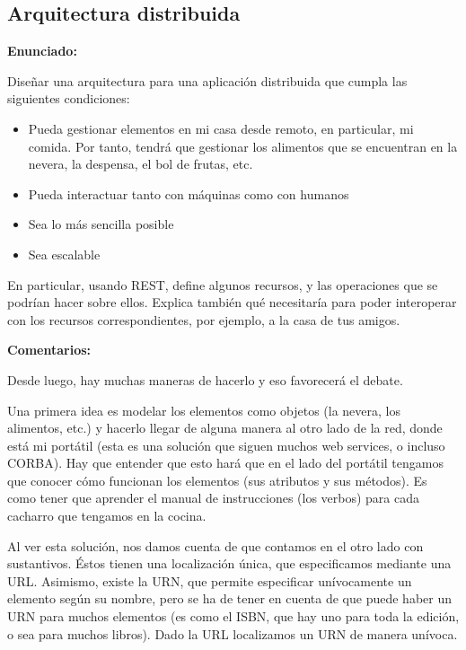 \subsection{Arquitectura distribuida}
\label{subsec:arq-distribuida}

\textbf{Enunciado:}

Diseñar una arquitectura para una aplicación distribuida que cumpla las siguientes condiciones:

\begin{itemize}
\item Pueda gestionar elementos en mi casa desde remoto, en particular, mi comida. Por tanto, tendrá que gestionar los alimentos que se encuentran en la nevera, la despensa, el bol de frutas, etc.
\item Pueda interactuar tanto con máquinas como con humanos
\item Sea lo más sencilla posible
\item Sea escalable
\end{itemize}

En particular, usando REST, define algunos recursos, y las operaciones que se podrían hacer sobre ellos. Explica también qué necesitaría para poder interoperar con los recursos correspondientes, por ejemplo, a la casa de tus amigos.

\textbf{Comentarios:}

Desde luego, hay muchas maneras de hacerlo y eso favorecerá el debate.

Una primera idea es modelar los elementos como objetos (la nevera, los alimentos, etc.) y hacerlo llegar de alguna manera al otro lado de la red, donde está mi portátil (esta es una solución que siguen muchos web services, o incluso CORBA). Hay que entender que esto hará que en el lado del portátil tengamos que conocer cómo funcionan los elementos (sus atributos y sus métodos). Es como tener que aprender el manual de instrucciones (los verbos) para cada cacharro que tengamos en la cocina.

Al ver esta solución, nos damos cuenta de que contamos en el otro lado con sustantivos. Éstos tienen una localización única, que especificamos mediante una URL. Asimismo, existe la URN, que permite especificar unívocamente un elemento según su nombre, pero se ha de tener en cuenta de que puede haber un URN para muchos elementos (es como el ISBN, que hay uno para toda la edición, o sea para muchos libros). Dado la URL localizamos un URN de manera unívoca.

